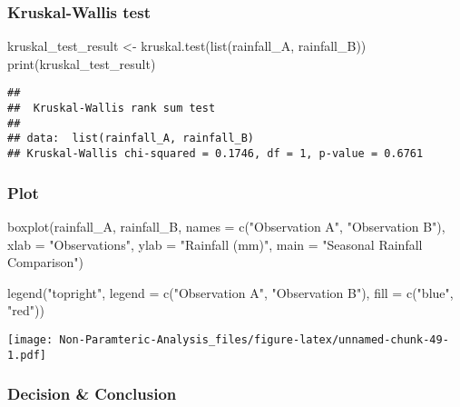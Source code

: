 \documentclass[
]{article}
\newenvironment{Shaded}{\begin{snugshade}}{\end{snugshade}}
\newcommand{\AttributeTok}[1]{\textcolor[rgb]{0.77,0.63,0.00}{#1}}
\newcommand{\FunctionTok}[1]{\textcolor[rgb]{0.00,0.00,0.00}{#1}}
\newcommand{\NormalTok}[1]{#1}
\newcommand{\OtherTok}[1]{\textcolor[rgb]{0.56,0.35,0.01}{#1}}
\newcommand{\StringTok}[1]{\textcolor[rgb]{0.31,0.60,0.02}{#1}}
\begin{document}
\hypertarget{kruskal-wallis-test-3}{%
\subsubsection{Kruskal-Wallis test}\label{kruskal-wallis-test-3}}

\begin{Shaded}
\begin{Highlighting}[]
\NormalTok{kruskal\_test\_result }\OtherTok{\textless{}{-}} \FunctionTok{kruskal.test}\NormalTok{(}\FunctionTok{list}\NormalTok{(rainfall\_A, rainfall\_B))}
\FunctionTok{print}\NormalTok{(kruskal\_test\_result)}
\end{Highlighting}
\end{Shaded}

\begin{verbatim}
## 
##  Kruskal-Wallis rank sum test
## 
## data:  list(rainfall_A, rainfall_B)
## Kruskal-Wallis chi-squared = 0.1746, df = 1, p-value = 0.6761
\end{verbatim}

\hypertarget{plot}{%
\subsubsection{Plot}\label{plot}}

\begin{Shaded}
\begin{Highlighting}[]
\FunctionTok{boxplot}\NormalTok{(rainfall\_A, rainfall\_B, }\AttributeTok{names =} \FunctionTok{c}\NormalTok{(}\StringTok{"Observation A"}\NormalTok{, }\StringTok{"Observation B"}\NormalTok{), }
        \AttributeTok{xlab =} \StringTok{"Observations"}\NormalTok{, }\AttributeTok{ylab =} \StringTok{"Rainfall (mm)"}\NormalTok{, }\AttributeTok{main =} \StringTok{"Seasonal Rainfall Comparison"}\NormalTok{)}

\FunctionTok{legend}\NormalTok{(}\StringTok{"topright"}\NormalTok{, }\AttributeTok{legend =} \FunctionTok{c}\NormalTok{(}\StringTok{"Observation A"}\NormalTok{, }\StringTok{"Observation B"}\NormalTok{), }\AttributeTok{fill =} \FunctionTok{c}\NormalTok{(}\StringTok{"blue"}\NormalTok{, }\StringTok{"red"}\NormalTok{))}
\end{Highlighting}
\end{Shaded}

\texttt{[image: Non-Paramteric-Analysis\_files/figure-latex/unnamed-chunk-49-1.pdf]}

\hypertarget{decision-conclusion-6}{%
\subsubsection{Decision \& Conclusion}\label{decision-conclusion-6}}
\end{document}
